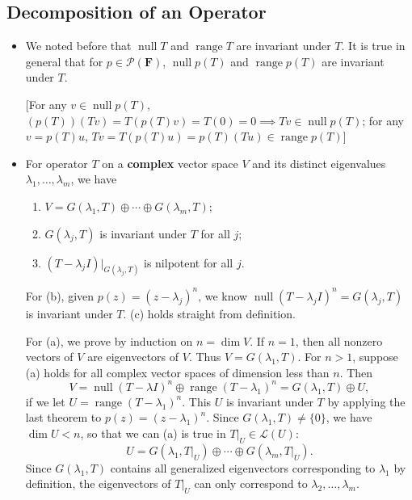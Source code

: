 \documentclass{article}
\newcommand{\F}{\mathbf{F}}
\newcommand{\n}{\operatorname{null}}
\renewcommand{\r}{\operatorname{range}}
\renewcommand{\d}{\dim}
\newcommand{\PF}{\mathcal{P}(\F)}
\begin{document}
\subsection{Decomposition of an Operator}
\begin{itemize}
    \item We noted before that $\n T$ and $\r T$ are invariant under $T$. It is true in general that for $p \in \PF$, $\n p(T)$ and $\r p(T)$ are invariant under $T$. 
	
    [For any $v \in \n p(T)$, $(p(T))(Tv) = T(p(T)v) = T(0) = 0 \implies Tv \in \n p(T)$; for any $v = p(T)u$, $Tv = T(p(T)u) = p(T)(Tu) \in \r p(T)$]
    \item For operator $T$ on a \textbf{complex} vector space $V$ and its distinct eigenvalues $\lambda_1,\dots,\lambda_m$, we have
    \begin{enumerate}[label=(\alph*)]
        \item $V = G(\lambda_1,T) \oplus \cdots \oplus G(\lambda_m,T)$;
	\item $G(\lambda_j,T)$ is invariant under $T$ for all $j$;
	\item $(T-\lambda_j I)|_{G(\lambda_j,T)}$ is nilpotent for all $j$.
    \end{enumerate}
	
    For (b), given $p(z) = (z-\lambda_j)^n$, we know $\n (T - \lambda_j I)^n = G(\lambda_j, T)$ is invariant under $T$. (c) holds straight from definition.
	
    For (a), we prove by induction on $n = \d V$. If $n = 1$, then all nonzero vectors of $V$ are eigenvectors of $V$. Thus $V = G(\lambda_1,T)$. For $n > 1$, suppose (a) holds for all complex vector spaces of dimension less than $n$. Then 
    \begin{equation}
        V = \n (T-\lambda I)^n \oplus \r (T-\lambda_1)^n = G(\lambda_1,T)\oplus U,
    \end{equation}
    if we let $U = \r (T-\lambda_1)^n$. This $U$ is invariant under $T$ by applying the last theorem to $p(z) = (z-\lambda_1)^n$. Since $G(\lambda_1,T) \ne \{0\}$, we have $\d U < n$, so that we can (a) is true in $T|_U \in \mathcal{L}(U)$: \[U = G(\lambda_1,T|_U) \oplus \cdots \oplus G(\lambda_m,T|_U).\] Since $G(\lambda_1,T)$ contains all generalized eigenvectors corresponding to $\lambda_1$ by definition, the eigenvectors of $T|_U$ can only correspond to $\lambda_2,\dots,\lambda_m$.


\end{itemize}
\end{document}
